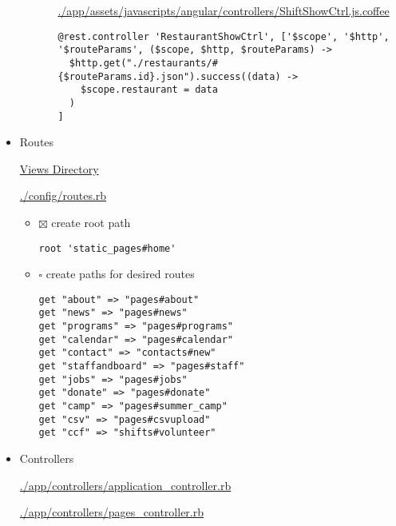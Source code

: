 \documentclass[11pt]{article}
\begin{document}
\begin{itemize}
\begin{itemize}
\begin{itemize}
\url{./app/assets/javascripts/angular/controllers/ShiftShowCtrl.js.coffee}

\begin{verbatim}
@rest.controller 'RestaurantShowCtrl', ['$scope', '$http', '$routeParams', ($scope, $http, $routeParams) ->
  $http.get("./restaurants/#{$routeParams.id}.json").success((data) ->
    $scope.restaurant = data
  )
]
\end{verbatim}
\end{itemize}
\end{itemize}




\item Routes
\label{sec-1-3-3-2}

\href{./app/views/}{Views Directory}

\url{./config/routes.rb}

\begin{itemize}
\item $\boxtimes$ create root path

\begin{verbatim}
root 'static_pages#home'
\end{verbatim}

\item $\square$ create paths for desired routes

\begin{verbatim}
get "about" => "pages#about"
get "news" => "pages#news"
get "programs" => "pages#programs"
get "calendar" => "pages#calendar"
get "contact" => "contacts#new"
get "staffandboard" => "pages#staff"
get "jobs" => "pages#jobs"
get "donate" => "pages#donate"
get "camp" => "pages#summer_camp"
get "csv" => "pages#csvupload"
get "ccf" => "shifts#volunteer"
\end{verbatim}
\end{itemize}


\item Controllers
\label{sec-1-3-3-3}

\url{./app/controllers/application_controller.rb}

\url{./app/controllers/pages_controller.rb}
\end{itemize}
\end{document}
